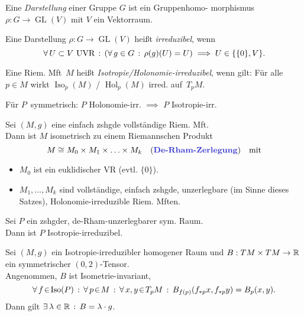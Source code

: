 \documentclass{cheat-sheet}
\DeclareMathOperator{\GL}{GL} %
\DeclareMathOperator{\Iso}{Iso} %
\DeclareMathOperator{\Hol}{Hol} %
\begin{document}

\begin{defn}
  Eine \emph{Darstellung} einer Gruppe $G$ ist ein Gruppenhomo- morphismus $\rho : G \to \GL(V)$ mit $V$ ein Vektorraum.
\end{defn}

\begin{defn}
  Eine Darstellung $\rho : G \to \GL(V)$ heißt \emph{irreduzibel}, wenn
  \[
    \forall \, {U \subset V \text{ UVR}} \,:\, (\forall \, {g \in G} \,:\, \rho(g)(U) = U) \implies U \in \{ \{ 0 \}, V \}.
  \]
\end{defn}

\begin{defn}
  Eine Riem. Mft~$M$ heißt \emph{Isotropie/Holonomie-irreduzibel}, wenn gilt:
  Für alle $p \in M$ wirkt $\Iso_p(M)$ / $\Hol_p(M)$ irred. auf~$T_p M$.
\end{defn}

\begin{bem}
  Für $P$~symmetrisch: $P$ Holonomie-irr. $\implies$ $P$ Isotropie-irr.
\end{bem}

\begin{satzdefn}
  Sei $(M, g)$ eine einfach zshgde vollständige Riem. Mft. \\
  Dann ist $M$ isometrisch zu einem Riemannschen Produkt
  \[
    M \cong M_0 \times M_1 \times \ldots \times M_k
    \quad \text{(\emph{De-Rham-Zerlegung})}
    \quad \text{mit}
  \]
  \begin{itemize}
    \item $M_0$ ist ein euklidischer VR (evtl. $\{ 0 \}$).
    \item $M_1, \ldots, M_k$ sind vollständige, einfach zshgde, unzerlegbare (im Sinne dieses Satzes), Holonomie-irreduzible Riem. Mften.
  \end{itemize}
\end{satzdefn}

\begin{satz}
  Sei $P$ ein zshgder, de-Rham-unzerlegbarer sym. Raum. \\
  Dann ist $P$ Isotropie-irreduzibel.
\end{satz}

\begin{lem}
  Sei $(M, g)$ ein Isotropie-irreduzibler homogener Raum und $B : TM \times TM \to \mathbb{R}$ ein symmetrischer $(0,2)$-Tensor. \\
  Angenommen, $B$ ist Isometrie-invariant, \dh{}
  \[ \fa{f \!\in\! \Iso(P)} \fa{p \!\in\! M} \fa{x, y \!\in\! T_p M} B_{f(p)}(f_{*p}x, f_{*p}y) = B_p(x, y). \]
  Dann gilt $\exists \, {\lambda \in \mathbb{R}} \,:\, B = \lambda \cdot g$.
\end{lem}
\end{document}
